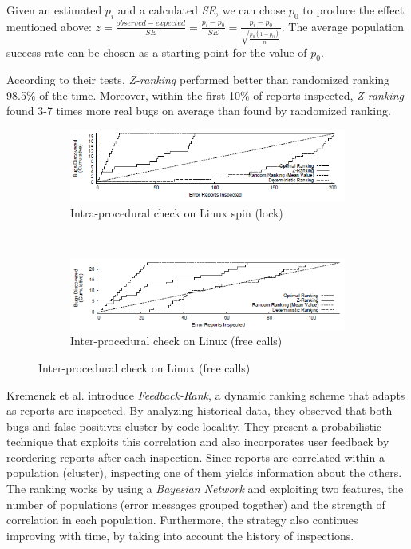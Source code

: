 \documentclass{article}
\begin{document}
 Given an estimated $p_i$ and a calculated \textit{SE}, we can chose $p_0$ to produce the effect mentioned above:
 $z=\frac{observed-expected}{SE}=\frac{p_i-p_0}{SE}=\frac{p_i-p_0}{\sqrt{\frac{p_0(1-p_0)}{n}}}$. The average population success rate can be chosen as a starting point for the value of $p_0$.

 According to their tests, \textit{Z-ranking} performed better than randomized ranking 98.5\% of the time. Moreover, within the first 10\% of reports inspected, \textit{Z-ranking} found 3-7 times more real bugs on average than found by randomized ranking.\\

 \begin{figure}[H]
     \begin{subfigure}{1\textwidth}
         \centering
         \includegraphics[scale=0.7]{./src/z_ranking_result_linux_intra.png}
         \caption{Intra-procedural check on Linux spin (lock)}
     \end{subfigure}\\
     \begin{subfigure}{1\textwidth}
         \centering
         \includegraphics[scale=0.7]{./src/z_ranking_result_linux_inter.png}
         \caption{Inter-procedural check on Linux (free calls)}
     \end{subfigure}
 \end{figure}


 Kremenek et al. \cite{correlation_exploitation} introduce \textit{Feedback-Rank}, a dynamic ranking scheme that adapts as reports are inspected. By analyzing historical data, they observed that both bugs and false positives cluster by code locality. They present a probabilistic technique that exploits this correlation and also incorporates user feedback by reordering reports after each inspection. Since reports are correlated within a population (cluster), inspecting one of them yields information about the others. The ranking works by using a \textit{Bayesian Network} and exploiting two features, the number of populations (error messages grouped together) and the strength of correlation in each population. Furthermore, the strategy also continues improving with time, by taking into account the history of inspections.
\end{document}
